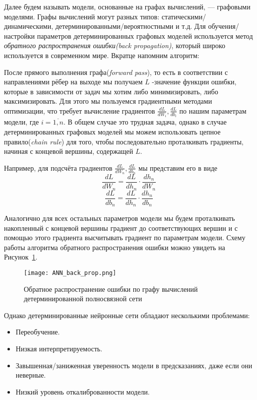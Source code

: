 Далее будем называть модели, основанные на графах вычислений, --- графовыми моделями. Графы вычислений могут разных типов:
 статическими/динамическими, детерминированными/вероятностными и т.д. Для обучения/настройки параметров детерминированных графовых моделей
 используется метод \textit{обратного распространения ошибки(back propagation)}, который широко используется в современном мире. Вкратце напомним алгоритм:

После прямого выполнения графа(\textit{forward pass}), то есть в соответствии с направлениями рёбер на выходе мы получаем
 $L$ -значение функции ошибки, которые в зависимости от задач мы хотим либо минимизировать, либо максимизировать. Для этого
 мы пользуемся градиентными методами оптимизации, что требует вычисление градиентов $\frac{dL}{d W_i}, \frac{dL}{d b_i}$ по нашим параметрам модели, где $i = \overline{1,n}$.
 В общем случае это трудная задача, однако в случае детерминированных графовых моделей мы можем использовать цепное правило(\textit{chain rule}) для того, чтобы последовательно
 проталкивать градиенты, начиная с концевой вершины, содержащей $L$.

 Например, для подсчёта градиентов $\frac{dL}{d W_n}, \frac{dL}{d b_n}$ мы представим его в виде
 $$\frac{dL}{d W_n} = \frac{dL}{d h_n} \cdot \frac{d h_n}{d W_n}$$
 $$\frac{dL}{d b_n} = \frac{dL}{d h_n} \cdot \frac{d h_n}{d b_n}$$

Аналогично для всех остальных параметров модели мы будем проталкивать накопленный с концевой вершины градиент до соответствующих вершин и
 с помощью этого градиента высчитывать градиент по параметрам модели. Схему работы алгоритма обратного распространения ошибки
 можно увидеть на Рисунок~\ref{fig:ANN_back_prop}.
\begin{figure}[H]
    \centering
    \texttt{[image: ANN\_back\_prop.png]}
    \caption{Обратное распространение ошибки по графу вычислений детерминированной полносвязной сети}
    \label{fig:ANN_back_prop}
\end{figure}

Однако детерминированные нейронные сети обладают несколькими проблемами:
\begin{itemize}
    \item Переобучение.
    \item Низкая интерпретируемость.
    \item Завышенная/заниженная уверенность модели в предсказаниях, даже если они неверные.
    \item Низкий уровень откалиброванности модели.
\end{itemize}

